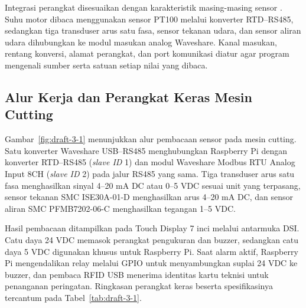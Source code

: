 Integrasi perangkat disesuaikan dengan karakteristik masing-masing sensor \citep{raspberrypi,waveshare}. Suhu motor dibaca menggunakan sensor PT100 melalui konverter RTD--RS485, sedangkan tiga transduser arus satu fasa, sensor tekanan udara, dan sensor aliran udara dihubungkan ke modul masukan analog Waveshare. Kanal masukan, rentang konversi, alamat perangkat, dan port komunikasi diatur agar program mengenali sumber serta satuan setiap nilai yang dibaca.

\subsection{Alur Kerja dan Perangkat Keras Mesin Cutting}

Gambar~\ref{fig:draft-3-1} menunjukkan alur pembacaan sensor pada mesin cutting. Satu konverter Waveshare USB--RS485 menghubungkan Raspberry Pi dengan konverter RTD--RS485 (\textit{slave ID} 1) dan modul Waveshare Modbus RTU Analog Input 8CH (\textit{slave ID} 2) pada jalur RS485 yang sama. Tiga transduser arus satu fasa menghasilkan sinyal 4--20 mA DC atau 0--5 VDC sesuai unit yang terpasang, sensor tekanan SMC ISE30A-01-D menghasilkan arus 4--20 mA DC, dan sensor aliran SMC PFMB7202-06-C menghasilkan tegangan 1--5 VDC.

Hasil pembacaan ditampilkan pada Touch Display 7 inci melalui antarmuka DSI. Catu daya 24 VDC memasok perangkat pengukuran dan buzzer, sedangkan catu daya 5 VDC digunakan khusus untuk Raspberry Pi. Saat alarm aktif, Raspberry Pi mengendalikan relay melalui GPIO untuk menyambungkan suplai 24 VDC ke buzzer, dan pembaca RFID USB menerima identitas kartu teknisi untuk penanganan peringatan. Ringkasan perangkat keras beserta spesifikasinya tercantum pada Tabel~\ref{tab:draft-3-1}.



